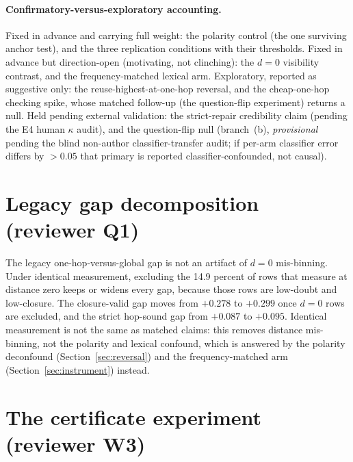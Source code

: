 \paragraph{Confirmatory-versus-exploratory accounting.} Fixed in advance and
carrying full weight: the polarity control (the one surviving anchor test),
and the three replication conditions with their thresholds. Fixed in advance
but direction-open (motivating, not clinching): the $d{=}0$ visibility
contrast, and the frequency-matched lexical arm. Exploratory, reported as
suggestive only: the reuse-highest-at-one-hop reversal, and the cheap-one-hop
checking spike, whose matched follow-up (the question-flip experiment) returns
a null. Held pending external validation: the
strict-repair credibility claim (pending the E4 human $\kappa$ audit), and
the question-flip null (branch~(b), \emph{provisional} pending the blind
non-author classifier-transfer audit; if per-arm classifier error differs by
$>0.05$ that primary is reported classifier-confounded, not causal).

\section{Legacy gap decomposition (reviewer Q1)}
\label{app:legacy}


The legacy one-hop-versus-global gap is not an artifact of $d{=}0$
mis-binning. Under identical measurement, excluding the 14.9 percent of
rows that measure at distance zero keeps or widens every gap, because those
rows are low-doubt and low-closure. The closure-valid gap moves from
$+0.278$ to $+0.299$ once $d{=}0$ rows are excluded, and the strict
hop-sound gap from $+0.087$ to $+0.095$.
Identical measurement is not the same as matched claims: this removes
distance mis-binning, not the polarity and lexical confound, which is
answered by the polarity deconfound (Section~\ref{sec:reversal}) and the
frequency-matched arm (Section~\ref{sec:instrument}) instead.

\section{The certificate experiment (reviewer W3)}
\label{app:expb}

